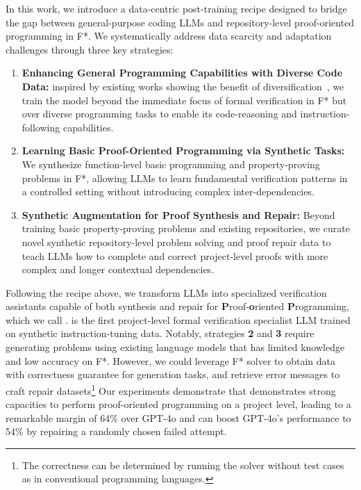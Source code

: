 In this work, we introduce a data-centric post-training recipe designed to bridge the gap between general-purpose coding LLMs and repository-level proof-oriented programming in F*. We systematically address data scarcity and adaptation challenges through three key strategies:
\begin{enumerate}
    \item \textbf{Enhancing General Programming Capabilities with Diverse Code Data:} inspired by existing works showing the benefit of diversification~\cite{zhang2024textbf,dong2023abilities,chen2024diversity}, we train the model beyond the immediate focus of formal verification in F* but over diverse programming tasks to enable its code-reasoning and instruction-following capabilities. 
    \item  \textbf{Learning Basic Proof-Oriented Programming via Synthetic Tasks:}
We synthesize function-level basic programming and property-proving problems in F*, allowing LLMs to learn fundamental verification patterns in a controlled setting without introducing complex inter-dependencies.
\item  \textbf{Synthetic Augmentation for Proof Synthesis and Repair:}
Beyond training basic property-proving problems and existing repositories, we curate novel synthetic repository-level problem solving and proof repair data to teach LLMs how to complete and correct project-level proofs with more complex and longer contextual dependencies.
\end{enumerate}
Following the recipe above, we transform LLMs into specialized verification assistants capable of both synthesis and repair for \textbf{P}roof-\textbf{o}riented \textbf{P}rogramming, which we call \name. \name is the first project-level formal verification specialist LLM trained on synthetic instruction-tuning data. 
Notably, strategies \textbf{2} and \textbf{3} require generating problems using existing language models that has limited knowledge and low accuracy on F*. 
However, we could leverage F* solver to obtain data with correctness guarantee for generation tasks, and retrieve error messages to craft repair datasets\footnote{The correctness can be determined by running the solver without test cases as in conventional programming languages.}
Our experiments demonstrate that \name demonstrates strong capacities to perform proof-oriented programming on a project level, leading to a remarkable margin of 64\% over GPT-4o and can boost GPT-4o's performance to 54\% by repairing a randomly chosen failed attempt.

